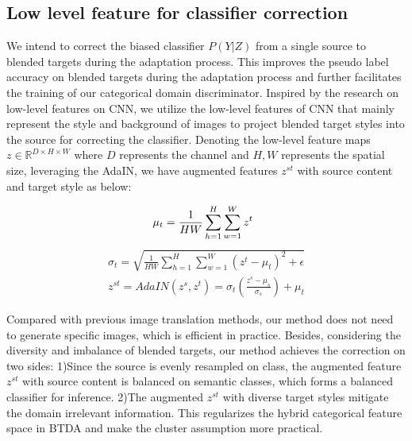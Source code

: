 \documentclass[letterpaper]{article} \usepackage{aaai23}  \usepackage{times}  \usepackage{helvet}  \usepackage{courier}  \usepackage[hyphens]{url}  \usepackage{graphicx} \urlstyle{rm} \def\UrlFont{\rm}  \usepackage{natbib}  \usepackage{caption} \frenchspacing  \setlength{\pdfpagewidth}{8.5in}  \setlength{\pdfpageheight}{11in}
\begin{document}
\subsection{Low level feature for classifier correction}
We intend to correct the biased classifier $P(Y|Z)$ from a single source to blended targets during the adaptation process. This improves the pseudo label accuracy on blended targets during the adaptation process and further facilitates the training of our categorical domain discriminator. Inspired by the research on low-level features on CNN, we utilize the low-level features of CNN that mainly represent the style and background of images to project blended target styles into the source for correcting the classifier. Denoting the low-level feature maps $z \in \mathbb{R}^{D\times H \times W}$ where $D$ represents the channel and $H,W$ represents the spatial size, leveraging the AdaIN, we have augmented features $z^{st}$ with source content and target style as below:
\begin{small}
\begin{equation}
\mu_t = \frac{1}{HW} \sum_{h=1}^H \sum_{w=1}^W z^t \hspace{2mm}
\end{equation}
\begin{equation}
\begin{split}
\sigma_t = \sqrt{\frac{1}{HW} \sum_{h=1}^H \sum_{w=1}^W (z^t - \mu_t)^2+\epsilon}
\end{split}
\end{equation}
\begin{equation}
\begin{split}
z^{st} = AdaIN(z^s, z^t) = \sigma_t (\frac{z^s - \mu_s}{\sigma_s}) + \mu_t
\end{split}
\end{equation}
\end{small}
Compared with previous image translation methods, our method does not need to generate specific images, which is efficient in practice. Besides, considering the diversity and imbalance of blended targets, our method achieves the correction on two sides: 1)Since the source is evenly resampled on class, the augmented feature $z^{st}$ with source content is balanced on semantic classes, which forms a balanced classifier for inference. 2)The augmented $z^{st}$ with diverse target styles mitigate the domain irrelevant information. This regularizes the hybrid categorical feature space in BTDA and make the cluster assumption more practical.
\end{document}
